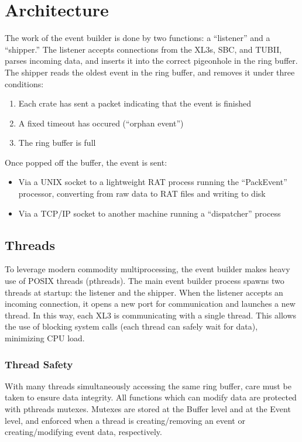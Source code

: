 \documentclass[11pt,twocolumn]{article}
\begin{document}
\section{Architecture}
The work of the event builder is done by two functions: a ``listener'' and a ``shipper.'' The listener accepts connections from the XL3s, SBC, and TUBII, parses incoming data, and inserts it into the correct pigeonhole in the ring buffer. The shipper reads the oldest event in the ring buffer, and removes it under three conditions:
\begin{enumerate}
\item Each crate has sent a packet indicating that the event is finished
\item A fixed timeout has occured (``orphan event'')
\item The ring buffer is full
\end{enumerate}
Once popped off the buffer, the event is sent:
\begin{itemize}
\item Via a UNIX socket to a lightweight RAT process running the ``PackEvent'' processor, converting from raw data to RAT files and writing to disk
\item Via a TCP/IP socket to another machine running a ``dispatcher'' process
\end{itemize}

\subsection{Threads}
To leverage modern commodity multiprocessing, the event builder makes heavy use of POSIX threads (pthreads). The main event builder process spawns two threads at startup: the listener and the shipper. When the listener accepts an incoming connection, it opens a new port for communication and launches a new thread. In this way, each XL3 is communicating with a single thread. This allows the use of blocking system calls (each thread can safely wait for data), minimizing CPU load.

\subsubsection{Thread Safety}
With many threads simultaneously accessing the same ring buffer, care must be taken to ensure data integrity. All functions which can modify data are protected with pthreads mutexes. Mutexes are stored at the Buffer level and at the Event level, and enforced when a thread is creating/removing an event or creating/modifying event data, respectively.
\end{document}
